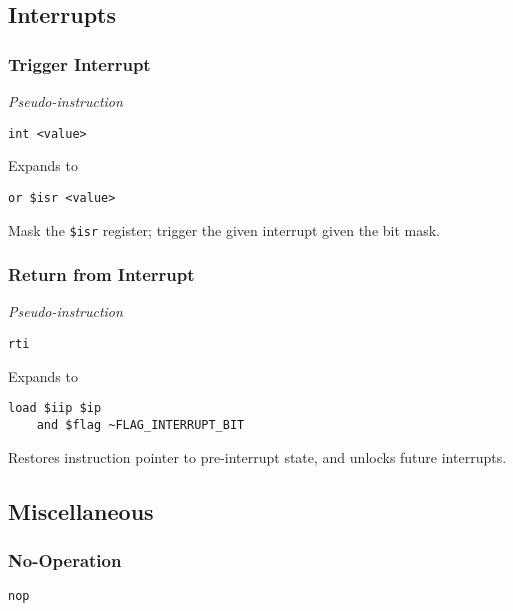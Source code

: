 \subsection{Interrupts}

\subsubsection{Trigger Interrupt}

\textit{Pseudo-instruction}

\begin{lstlisting}[style=assembly]
    int <value>
\end{lstlisting}

Expands to

\begin{lstlisting}[style=assembly]
    or $isr <value>
\end{lstlisting}

Mask the \texttt{\$isr} register; trigger the given interrupt given the bit mask.

\subsubsection{Return from Interrupt}

\textit{Pseudo-instruction}

\begin{lstlisting}[style=assembly]
    rti
\end{lstlisting}

Expands to

\begin{lstlisting}[style=assembly]
    load $iip $ip
    and $flag ~FLAG_INTERRUPT_BIT
\end{lstlisting}

Restores instruction pointer to pre-interrupt state, and unlocks future interrupts.

\subsection{Miscellaneous}

\subsubsection{No-Operation}

\begin{lstlisting}[style=assembly]
    nop
\end{lstlisting}

